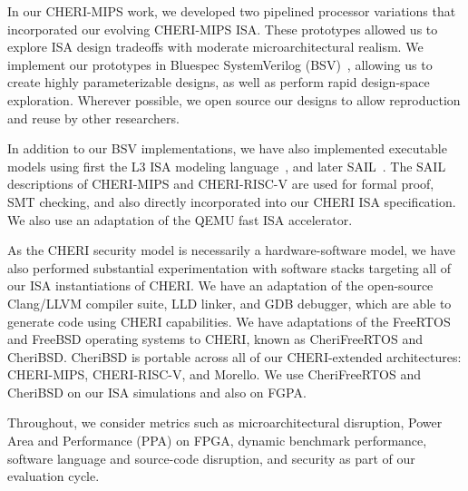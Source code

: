 In our CHERI-MIPS work, we developed two pipelined processor variations that
incorporated our evolving CHERI-MIPS ISA.
These prototypes allowed us to explore ISA design tradeoffs with moderate
microarchitectural realism.
We implement our prototypes in Bluespec SystemVerilog
(BSV)~\cite{Bluespec:TFRG}, allowing us to create highly parameterizable
designs, as well as perform rapid design-space exploration.
Wherever possible, we open source our designs to allow reproduction and reuse
by other researchers.

In addition to our BSV implementations, we have also implemented executable
models using first the L3 ISA modeling language~\cite{Fox2015}, and later
SAIL~\cite{sail-popl2019}.
The SAIL descriptions of CHERI-MIPS and CHERI-RISC-V are used for formal
proof, SMT checking, and also directly incorporated into our CHERI ISA
specification.
We also use an adaptation of the QEMU fast ISA accelerator.

As the CHERI security model is necessarily a hardware-software model, we have
also performed substantial experimentation with software stacks targeting all
of our ISA instantiations of CHERI.
We have an adaptation of the open-source Clang/LLVM compiler suite, LLD
linker, and GDB debugger, which are able to generate code using CHERI
capabilities.
We have adaptations of the FreeRTOS and FreeBSD operating systems to CHERI,
known as CheriFreeRTOS and CheriBSD.
CheriBSD is portable across all of our CHERI-extended architectures:
CHERI-MIPS, CHERI-RISC-V, and Morello.
We use CheriFreeRTOS and CheriBSD on our ISA simulations and also on FGPA.

Throughout, we consider metrics such as microarchitectural disruption, Power
Area and Performance (PPA) on FPGA, dynamic benchmark performance, software
language and source-code disruption, and security as part of our evaluation
cycle.
